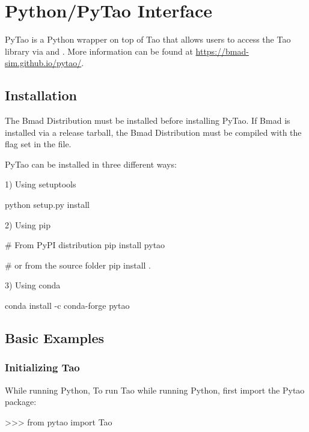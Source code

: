 \documentclass{hitec}     %
\begin{document}
{{{{%

\appendix

\section{Python/PyTao Interface}

PyTao is a Python wrapper on top of Tao that allows users to access the Tao library via  and . More information can be found at \url{https://bmad-sim.github.io/pytao/}.

\subsection{Installation}

The Bmad Distribution must be installed before installing PyTao. If Bmad is installed via a release tarball, the Bmad Distribution must be compiled with the  flag set in the  file. 

PyTao can be installed in three different ways:

1) Using setuptools
\begin{code}
python setup.py install
\end{code}

2) Using pip
\begin{code}
# From PyPI distribution
pip install pytao

# or from the source folder
pip install .

\end{code}

3) Using conda
\begin{code}
conda install -c conda-forge pytao
\end{code}

\subsection{Basic Examples}

\subsubsection{Initializing Tao}
While running Python,
To run Tao while running Python, first import the Pytao package:
\begin{code}
>>> from pytao import Tao
\end{code}

}}}}
\end{document}
